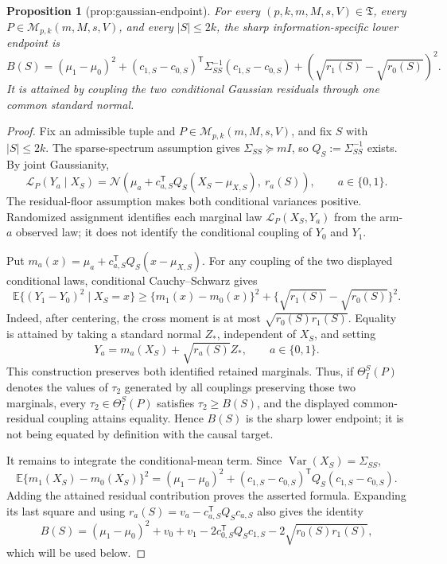\documentclass{article}
\newtheorem{proposition}{Proposition}
\begin{document}
\begin{proposition}[prop:gaussian-endpoint]\label{prop:gaussian-endpoint}
For every \((p,k,m,M,s,V)\in\mathfrak T\), every \(P\in\mathcal M_{p,k}(m,M,s,V)\), and every \(|S|\le2k\), the sharp information-specific lower endpoint is \[B(S)=(\mu_1-\mu_0)^2+(c_{1,S}-c_{0,S})^{\mathsf T}\Sigma_{SS}^{-1}(c_{1,S}-c_{0,S})+(\sqrt{r_1(S)}-\sqrt{r_0(S)})^2.\] It is attained by coupling the two conditional Gaussian residuals through one common standard normal.
\end{proposition}
\begin{proof}
Fix an admissible tuple and \(P\in\mathcal M_{p,k}(m,M,s,V)\), and fix \(S\) with \(|S|\leq 2k\).  The sparse-spectrum assumption gives \(\Sigma_{SS}\succeq mI\), so \(Q_S:=\Sigma_{SS}^{-1}\) exists.  By joint Gaussianity,
\[
 \mathcal L_P(Y_a\mid X_S)
 =\mathcal N\!\left(\mu_a+c_{a,S}^{\mathsf T}Q_S(X_S-\mu_{X,S}),\ r_a(S)\right),
 \qquad a\in\{0,1\}.
\]
The residual-floor assumption makes both conditional variances positive.  Randomized assignment identifies each marginal law \(\mathcal L_P(X_S,Y_a)\) from the arm-\(a\) observed law; it does not identify the conditional coupling of \(Y_0\) and \(Y_1\).

Put \(m_a(x)=\mu_a+c_{a,S}^{\mathsf T}Q_S(x-\mu_{X,S})\).  For any coupling of the two displayed conditional laws, conditional Cauchy--Schwarz gives
\[
 \mathbb E\{(Y_1-Y_0)^2\mid X_S=x\}
 \geq \{m_1(x)-m_0(x)\}^2+
 \{\sqrt{r_1(S)}-\sqrt{r_0(S)}\}^2.
\]
Indeed, after centering, the cross moment is at most
\(\sqrt{r_0(S)r_1(S)}\).  Equality is attained by taking a standard normal \(Z_*\), independent of \(X_S\), and setting
\[
 Y_a=m_a(X_S)+\sqrt{r_a(S)}Z_*,\qquad a\in\{0,1\}.
\]
This construction preserves both identified retained marginals.  Thus, if \(\Theta_I^S(P)\) denotes the values of \(\tau_2\) generated by all couplings preserving those two marginals, every \(\tau_2\in\Theta_I^S(P)\) satisfies \(\tau_2\geq B(S)\), and the displayed common-residual coupling attains equality.  Hence \(B(S)\) is the sharp lower endpoint; it is not being equated by definition with the causal target.

It remains to integrate the conditional-mean term.  Since
\(\operatorname{Var}(X_S)=\Sigma_{SS}\),
\[
 \mathbb E\{m_1(X_S)-m_0(X_S)\}^2
 = (\mu_1-\mu_0)^2
 +(c_{1,S}-c_{0,S})^{\mathsf T}Q_S(c_{1,S}-c_{0,S}).
\]
Adding the attained residual contribution proves the asserted formula.  Expanding its last square and using
\(r_a(S)=v_a-c_{a,S}^{\mathsf T}Q_Sc_{a,S}\) also gives the identity
\[
 B(S)=(\mu_1-\mu_0)^2+v_0+v_1
 -2c_{0,S}^{\mathsf T}Q_Sc_{1,S}
 -2\sqrt{r_0(S)r_1(S)},
\]
which will be used below.
\end{proof}
\end{document}
